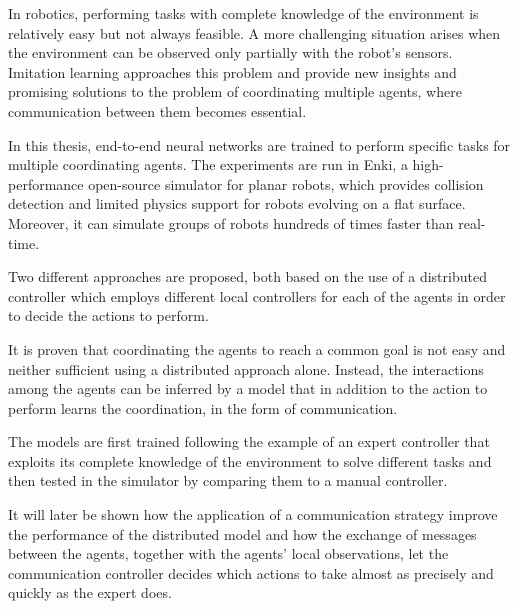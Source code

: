 In robotics, performing tasks with complete knowledge of the environment is 
relatively easy but not always feasible. A more challenging situation arises 
when the environment can be observed only partially with the robot's sensors. 
Imitation learning approaches this problem and provide new insights and 
promising solutions to the problem of coordinating multiple agents, where 
communication between them becomes essential.

In this thesis, end-to-end neural networks are trained to perform specific tasks for 
multiple coordinating agents. The experiments are run in Enki, a 
high-performance open-source simulator for planar robots, which provides 
collision detection and limited physics support for robots evolving on a flat 
surface. Moreover, it can simulate groups of robots hundreds of times faster than 
real-time.

Two different approaches are proposed, both based on the use of a distributed 
controller which employs different local controllers for each of the agents in order 
to decide the actions to perform. 

It is proven that coordinating the agents to reach a common goal is not easy and 
neither sufficient using a distributed approach alone. Instead, the interactions 
among the agents can be inferred by a model that in addition to the action to 
perform learns the coordination, in the form of communication. 

The models are first trained following the example of an expert controller that 
exploits its complete knowledge of the environment to solve different tasks and 
then tested in the simulator by comparing them to a manual controller.

It will later be shown how the application of a communication strategy improve 
the performance of the distributed model and how the exchange of messages 
between the agents, together with the agents' local observations, let the 
communication controller decides which actions to take almost as precisely and 
quickly as the expert does.
